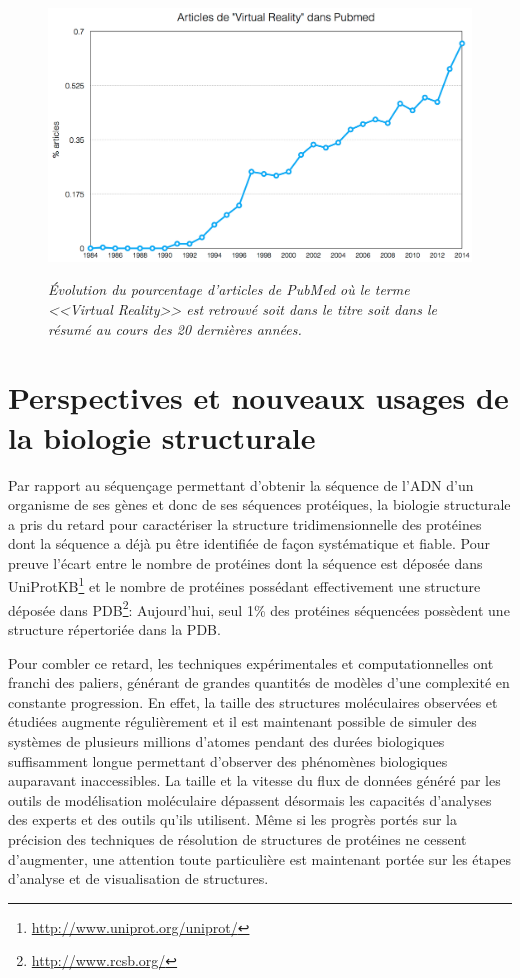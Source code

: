 \begin{figure}
  \centering
  {\includegraphics[width=.75\linewidth]{./figures/ch1/VR_pubmed_trend.png}}
    \caption[Évolution des articles traitant de Réalité Virtuelle dans PubMed.]{\it Évolution du pourcentage d'articles de PubMed où le terme <<Virtual Reality>> est retrouvé soit dans le titre soit dans le résumé au cours des 20 dernières années.}
  \label{Fig:VR_pubmed_trend}
  \hspace{0.2cm}
\end{figure}

\section{Perspectives et nouveaux usages de la biologie structurale} \label{limits_persp_bio_struct}

Par rapport au séquençage permettant d'obtenir la séquence de l'ADN d'un organisme de ses gènes et donc de ses séquences protéiques, la biologie structurale a pris du retard pour caractériser la structure tridimensionnelle des protéines dont la séquence a déjà pu être identifiée de façon systématique et fiable. Pour preuve l'écart entre le nombre de protéines dont la séquence est déposée dans UniProtKB\footnote{\url{http://www.uniprot.org/uniprot/}} et le nombre de protéines possédant effectivement une structure déposée dans PDB\footnote{\url{http://www.rcsb.org/}}: Aujourd'hui, seul 1\% des protéines séquencées possèdent une structure répertoriée dans la PDB. 

Pour combler ce retard, les techniques expérimentales et computationnelles ont franchi des paliers, générant de grandes quantités de modèles d'une complexité en constante progression. En effet, la taille des structures moléculaires observées et étudiées augmente régulièrement et il est maintenant possible de simuler des systèmes de plusieurs millions d'atomes pendant des durées biologiques suffisamment longue permettant d'observer des phénomènes biologiques auparavant inaccessibles. La taille et la vitesse du flux de données généré par les outils de modélisation moléculaire dépassent désormais les capacités d'analyses des experts et des outils qu'ils utilisent. Même si les progrès portés sur la précision des techniques de résolution de structures de protéines ne cessent d'augmenter, une attention toute particulière est maintenant portée sur les étapes d'analyse et de visualisation de structures.

